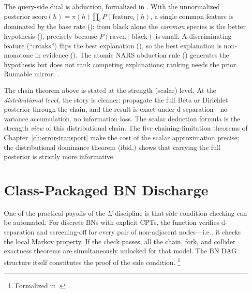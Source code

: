\documentclass[11pt,openany]{report}
\begin{document}
The query-side dual is abduction, formalized in
.  With the unnormalized
posterior $\mathrm{score}(h)=\pi(h)\prod_i P(\mathrm{feature}_i\mid h)$, a single
common feature is dominated by the base rate
(): from $\mathrm{black}$ alone the
\emph{common} species is the better hypothesis (),
precisely because $P(\mathrm{raven}\mid\mathrm{black})$ is small.  A
discriminating feature (``croaks'') flips the best explanation
(), so the best explanation is
non-monotone in evidence ().  The atomic NARS
abduction rule () generates the hypothesis but does not
rank competing explanations; ranking needs the prior.  Runnable mirror:
.

The chain theorem above is stated at the strength (scalar) level.
At the \emph{distributional level}, the story is cleaner: propagate
the full Beta or Dirichlet posterior through the chain, and the
result is exact under d-separation---no variance accumulation, no
information loss.  The scalar deduction formula is the strength
\emph{view} of this distributional chain.  The five
chaining-limitation theorems of Chapter~\ref{ch:error-transport}
make the cost of the scalar approximation precise; the distributional
dominance theorem (ibid.) shows that carrying the full posterior is
strictly more informative.



\section{Class-Packaged BN Discharge}

One of the practical payoffs of the $\Sigma$-discipline is that
side-condition checking can be automated.  For discrete BNs with
explicit CPTs, the function
 verifies d-separation and
screening-off for every pair of non-adjacent nodes---i.e., it
checks the local Markov property.  If the check passes, all the
chain, fork, and collider exactness theorems are simultaneously
unlocked for that model.  The BN DAG structure itself constitutes
the proof of the side condition.%
\footnote{Formalized in
.}
\end{document}

